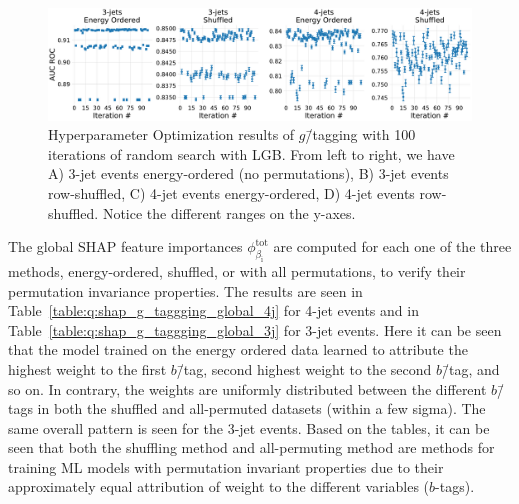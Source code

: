 \begin{figure}[h!]%
  \centerfloat
  \includegraphics[width=1\textwidth, trim=0 0 0 0, clip]{figures/quarks/cv_res_lgb-gtag-down_sample=1.00-ML_vars=vertex-selection=b-ejet_min=4-n_iter_RS_lgb=99-n_iter_RS_xgb=9-cdot_cut=0.90-version=19.pdf}
  \vspace{3mm}
  \caption[Hyperparameter Optimization of $g$\=/Tagging]{
    Hyperparameter Optimization results of $g$\=/tagging with \num{100} iterations of random search with LGB. From left to right, we have A) 3-jet events energy-ordered (no permutations), B) 3-jet events row-shuffled, C) 4-jet events energy-ordered, D) 4-jet events row-shuffled. Notice the different ranges on the y-axes.}
  \label{fig:q:CV_res_iterations_g_tagging}%
\end{figure}

The global SHAP feature importances $\phi^\mathrm{tot}_{\beta_\mathrm{i}}$ are computed for each one of the three methods, energy-ordered, shuffled, or with all permutations, to verify their permutation invariance properties. The results are seen in Table~\ref{table:q:shap_g_taggging_global_4j} for 4-jet events and in Table~\ref{table:q:shap_g_taggging_global_3j} for 3-jet events. Here it can be seen that the model trained on the energy ordered data learned to attribute the highest weight to the first $b$\=/tag, second highest weight to the second $b$\=/tag, and so on. In contrary, the weights are uniformly distributed between the different $b$\=/tags in both the shuffled and all-permuted datasets (within a few sigma). The same overall pattern is seen for the 3-jet events. Based on the tables, it can be seen that both the shuffling method and all-permuting method are methods for training ML models with permutation invariant properties due to their approximately equal attribution of weight to the different variables ($b$-tags). 

